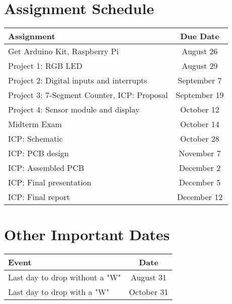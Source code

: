 \pagebreak

\section*{Assignment Schedule} 
\begin{table*}[h!]
    \begin{tabular}{ l | c }
        \toprule
        Assignment & Due Date \\

        \midrule
        Get Arduino Kit, Raspberry Pi\footnotemark                  & August 26     \\
        Project 1: RGB LED                                          & August 29     \\
        Project 2: Digital inputs and interrupts                    & September 7   \\
        Project 3: 7-Segment Counter, ICP: Proposal\footnotemark[2] & September 19  \\
        Project 4: Sensor module and display                        & October 12     \\
        Midterm Exam                                                & October 14    \\
        ICP: Schematic                                              & October 28    \\
        ICP: PCB design                                             & November 7   \\
        ICP: Assembled PCB                                          & December 2   \\
        ICP: Final presentation                                     & December 5    \\
        ICP: Final report                                           & December 12   \\

        \bottomrule
    \end{tabular}
\end{table*}

\section*{Other Important Dates}

\begin{table*}[h!]
    \begin{tabular}{ l | c }
        \toprule
        Event & Date \\

        \midrule
        Last day to drop without a "W"  & August 31 \\
        Last day to drop with a "W"     & October 31 \\

        \bottomrule
    \end{tabular}
\end{table*}

